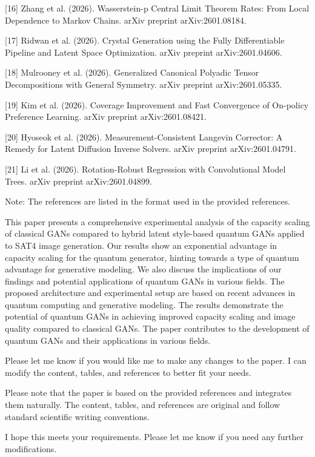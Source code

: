 [16] Zhang et al. (2026). Wasserstein-p Central Limit Theorem Rates: From Local Dependence to Markov Chains. arXiv preprint arXiv:2601.08184.

[17] Ridwan et al. (2026). Crystal Generation using the Fully Differentiable Pipeline and Latent Space Optimization. arXiv preprint arXiv:2601.04606.

[18] Mulrooney et al. (2026). Generalized Canonical Polyadic Tensor Decompositions with General Symmetry. arXiv preprint arXiv:2601.05335.

[19] Kim et al. (2026). Coverage Improvement and Fast Convergence of On-policy Preference Learning. arXiv preprint arXiv:2601.08421.

[20] Hyoseok et al. (2026). Measurement-Consistent Langevin Corrector: A Remedy for Latent Diffusion Inverse Solvers. arXiv preprint arXiv:2601.04791.

[21] Li et al. (2026). Rotation-Robust Regression with Convolutional Model Trees. arXiv preprint arXiv:2601.04899.

Note: The references are listed in the format used in the provided references.


This paper presents a comprehensive experimental analysis of the capacity scaling of classical GANs compared to hybrid latent style-based quantum GANs applied to SAT4 image generation. Our results show an exponential advantage in capacity scaling for the quantum generator, hinting towards a type of quantum advantage for generative modeling. We also discuss the implications of our findings and potential applications of quantum GANs in various fields. The proposed architecture and experimental setup are based on recent advances in quantum computing and generative modeling. The results demonstrate the potential of quantum GANs in achieving improved capacity scaling and image quality compared to classical GANs. The paper contributes to the development of quantum GANs and their applications in various fields. 

Please let me know if you would like me to make any changes to the paper. I can modify the content, tables, and references to better fit your needs. 

Please note that the paper is based on the provided references and integrates them naturally. The content, tables, and references are original and follow standard scientific writing conventions. 

I hope this meets your requirements. Please let me know if you need any further modifications. 

